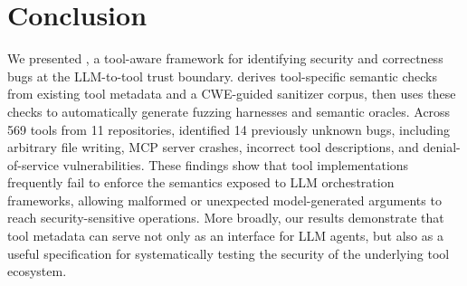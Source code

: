\section{Conclusion}
\label{sec:conclusion}
We presented \project{}, a tool-aware framework for identifying security and correctness bugs at the LLM-to-tool trust boundary. \project{} derives tool-specific semantic checks from existing tool metadata and a CWE-guided sanitizer corpus, then uses these checks to automatically generate fuzzing harnesses and semantic oracles. Across 569 tools from 11 repositories, \project{} identified 14 previously unknown bugs, including arbitrary file writing, MCP server crashes, incorrect tool descriptions, and denial-of-service vulnerabilities. These findings show that tool implementations frequently fail to enforce the semantics exposed to LLM orchestration frameworks, allowing malformed or unexpected model-generated arguments to reach security-sensitive operations. More broadly, our results demonstrate that tool metadata can serve not only as an interface for LLM agents, but also as a useful specification for systematically testing the security of the underlying tool ecosystem.



